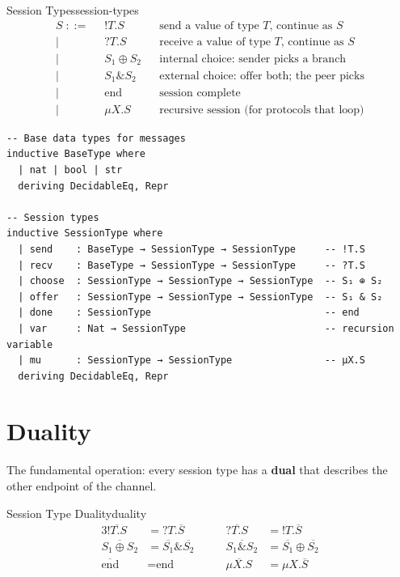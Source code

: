 \documentclass[11pt, a4paper, oneside]{book}
\begin{document}
\begin{defn}{Session Types}{session-types}
\begin{align*}
  S \;::=\;&\; !T.S &&\text{send a value of type $T$, continue as $S$} \\
  \mid\;&\; ?T.S &&\text{receive a value of type $T$, continue as $S$} \\
  \mid\;&\; S_1 \oplus S_2 &&\text{internal choice: sender picks a branch} \\
  \mid\;&\; S_1 \mathbin{\&} S_2 &&\text{external choice: offer both; the peer picks} \\
  \mid\;&\; \text{end} &&\text{session complete} \\
  \mid\;&\; \mu X. S &&\text{recursive session (for protocols that loop)}
\end{align*}
\end{defn}

\begin{leanbox}
\begin{verbatim}
-- Base data types for messages
inductive BaseType where
  | nat | bool | str
  deriving DecidableEq, Repr

-- Session types
inductive SessionType where
  | send    : BaseType → SessionType → SessionType     -- !T.S
  | recv    : BaseType → SessionType → SessionType     -- ?T.S
  | choose  : SessionType → SessionType → SessionType  -- S₁ ⊕ S₂
  | offer   : SessionType → SessionType → SessionType  -- S₁ & S₂
  | done    : SessionType                              -- end
  | var     : Nat → SessionType                        -- recursion variable
  | mu      : SessionType → SessionType                -- μX.S
  deriving DecidableEq, Repr
\end{verbatim}
\end{leanbox}

\section{Duality}

The fundamental operation: every session type has a \textbf{dual} that
describes the other endpoint of the channel.

\begin{defn}{Session Type Duality}{duality}
\begin{alignat*}{3}
  \overline{!T.S} &= ?T.\overline{S} &\qquad
  \overline{?T.S} &= !T.\overline{S} \\
  \overline{S_1 \oplus S_2} &= \overline{S_1} \mathbin{\&} \overline{S_2} &\qquad
  \overline{S_1 \mathbin{\&} S_2} &= \overline{S_1} \oplus \overline{S_2} \\
  \overline{\text{end}} &= \text{end} &\qquad
  \overline{\mu X. S} &= \mu X. \overline{S}
\end{alignat*}
\end{defn}
\end{document}
